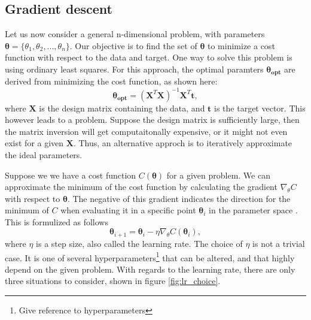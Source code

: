 \subsection*{Gradient descent}
Let us now consider a general n-dimensional problem, with parameters $\boldsymbol{\theta} = \{\theta_1, \theta_2, ..., \theta_n\}$. 
Our objective is to find the set of $\boldsymbol{\theta}$ to minimize a cost function with respect to the data and target. 
One way to solve this problem is using ordinary least squares. For this approach, 
the optimal paramters $\boldsymbol{\theta_{opt}}$ are derived from minimizing the cost function, as shown here:
\begin{equation*}
    \boldsymbol{\theta_{opt}} = (\boldsymbol{X}^T\boldsymbol{X})^{-1}\boldsymbol{X}^T\boldsymbol{t},
\end{equation*}
where $\boldsymbol{X}$ is the design matrix containing the data, and $\boldsymbol{t}$ is the target vector. This however leads to a problem. Suppose the design matrix is sufficiently large,
then the matrix inversion will get computaitonally expensive, or it might not even exist for a given $\boldsymbol{X}$. Thus, an alternative approch is to iteratively approximate the ideal 
parameters. \par 
Suppose we we have a cost function $C(\boldsymbol{\theta})$ for a given problem. We can approximate the minimum of the cost function by calculating
the gradient $\nabla_{\theta}C$ with respect to $\boldsymbol{\theta}$. The negative of this gradient indicates the direction for the minimum of $C$ when evaluating 
it in a specific point $\boldsymbol{\theta}_i$ in the parameter space \cite{FYSSTK}. This is formulized as follows 
\begin{equation}
    \boldsymbol{\theta}_{i+1} = \boldsymbol{\theta}_i - \eta\nabla_{\theta}C(\boldsymbol{\theta}_i),
\end{equation}
where $\eta$ is a step size, also called the learning rate. The choice of $\eta$ is not a trivial case. It is one of several 
hyperparameters\footnote{Give reference to hyperparameters}
that can be altered, and that highly depend on the given problem. With regards to the learning rate, there are only three situations to consider, shown in figure \ref{fig:lr_choice}.

